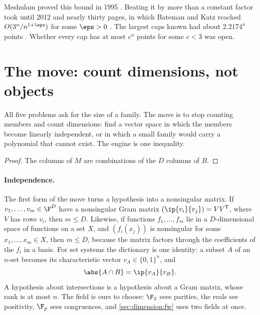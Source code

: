 \begin{refsection}
Meshulam proved this bound in 1995 \parencite{Meshulam1995}. Beating it by more than a constant factor took until 2012 and nearly thirty pages, in which Bateman and Katz reached $O(3^n/n^{1+\eps})$ for some $\eps>0$ \parencite{BatemanKatz2012}. The largest caps known had about $2.2174^n$ points \parencite{Edel2004}. Whether every cap has at most $c^n$ points for some $c<3$ was open.

\section{The move: count dimensions, not objects}\label{sec:dimension:move}

All five problems ask for the size of a family. The move is to stop counting members and count dimensions: find a vector space in which the members become linearly independent, or in which a small family would carry a polynomial that cannot exist. The engine is one inequality.


\begin{proof}
The columns of $M$ are combinations of the $D$ columns of $B$.
\end{proof}

\paragraph{Independence.} The first form of the move turns a hypothesis into a nonsingular matrix. If $v_1,\dots,v_m\in\F^D$ have a nonsingular Gram matrix $(\ip{v_i}{v_j})=VV^{\mathsf T}$, where $V$ has rows $v_i$, then $m\le D$. Likewise, if functions $f_1,\dots,f_m$ lie in a $D$-dimensional space of functions on a set $X$, and $(f_i(x_j))$ is nonsingular for some $x_1,\dots,x_m\in X$, then $m\le D$, because the matrix factors through the coefficients of the $f_i$ in a basis. For set systems the dictionary is one identity: a subset $A$ of an $n$-set becomes its characteristic vector $v_A\in\{0,1\}^n$, and
\begin{equation}\label{eq:dimension:dictionary}
\abs{A\cap B}=\ip{v_A}{v_B}.
\end{equation}
A hypothesis about intersections is a hypothesis about a Gram matrix, whose rank is at most $n$. The field is ours to choose: $\F_2$ sees parities, the reals see positivity, $\F_p$ sees congruences, and \cref{sec:dimension:fw} uses two fields at once.


\end{refsection}
